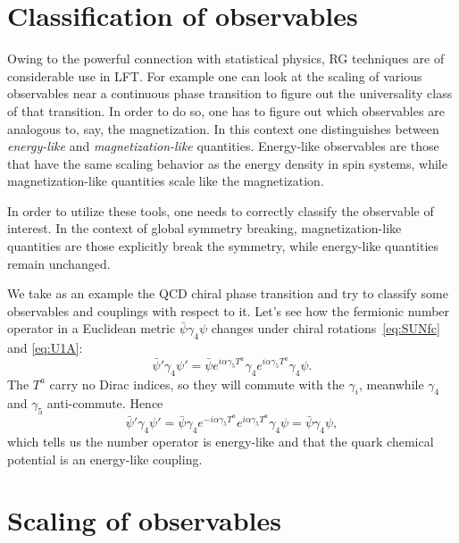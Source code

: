 \section{Classification of observables}


Owing to the powerful connection with statistical physics, RG techniques are of
considerable use in LFT. For example one can look at the scaling of various
observables near a continuous phase transition to figure out the universality
class of that transition. In order to do so, one has to figure out which
observables are analogous to, say, the magnetization. In this context one
distinguishes between {\it energy-like} and {\it
magnetization-like} quantities. Energy-like
observables are those that have the same scaling behavior as the energy density
in spin systems, while magnetization-like quantities scale like the
magnetization.

In order to utilize these tools, one needs to correctly classify the observable
of interest. In the context of global symmetry breaking, magnetization-like
quantities are those explicitly break the symmetry, while energy-like quantities
remain unchanged.

We take as an example the QCD chiral phase transition and try to classify some
observables and couplings with respect to it. Let's see how the fermionic
number operator in a Euclidean metric $\bar{\psi}\gamma_4\psi$ changes under
chiral rotations~\eqref{eq:SUNfc} and \eqref{eq:U1A}:
\begin{equation}
  \bar{\psi}'\gamma_4\psi'
    =\bar{\psi}e^{i\alpha\gamma_5T^a}\gamma_4e^{i\alpha\gamma_5T^a}\gamma_4\psi.
\end{equation}
The $T^a$ carry no Dirac indices, so they will commute with the $\gamma_i$,
meanwhile $\gamma_4$ and $\gamma_5$ anti-commute. Hence
\begin{equation}
  \bar{\psi}'\gamma_4\psi'
    =\bar{\psi}\gamma_4e^{-i\alpha\gamma_5T^a}e^{i\alpha\gamma_5T^a}\gamma_4\psi
    =\bar{\psi}\gamma_4\psi,
\end{equation}
which tells us the number operator is energy-like and that the quark chemical
potential is an energy-like coupling.

\section{Scaling of observables}


